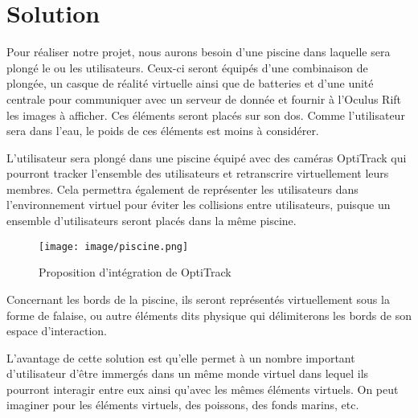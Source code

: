 \chapter{Solution}

Pour réaliser notre projet, nous aurons besoin d’une piscine dans laquelle sera plongé le ou les utilisateurs. Ceux-ci seront équipés d’une combinaison de plongée, un casque de réalité virtuelle ainsi que de batteries et d’une unité centrale pour communiquer avec un serveur de donnée et fournir à l’Oculus Rift les images à afficher. Ces éléments seront placés sur son dos. Comme l’utilisateur sera dans l’eau, le poids de ces éléments est moins à considérer.
 
L’utilisateur sera plongé dans une piscine équipé avec des caméras OptiTrack qui pourront tracker l’ensemble des utilisateurs et retranscrire virtuellement leurs membres. Cela permettra également de représenter les utilisateurs dans l’environnement virtuel pour éviter les collisions entre utilisateurs, puisque un ensemble d’utilisateurs seront placés dans la même piscine. 


\begin{figure}[!ht]
	\center	
	\texttt{[image: image/piscine.png]}
	\caption{Proposition d'intégration de OptiTrack}
\end{figure}


Concernant les bords de la piscine, ils seront représentés virtuellement sous la forme de falaise, ou autre éléments dits physique qui délimiterons les bords de son espace d’interaction.

L’avantage de cette solution est qu’elle permet à un nombre important d’utilisateur d’être immergés dans un même monde virtuel dans lequel ils pourront interagir entre eux ainsi qu’avec les mêmes éléments virtuels. On peut imaginer pour les éléments virtuels, des poissons, des fonds marins, etc.